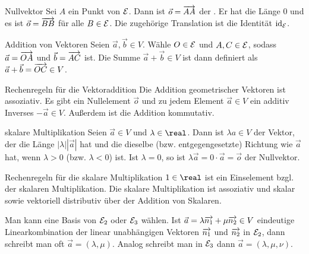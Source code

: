 \begin{Def}{Nullvektor}
    Sei $A$ ein Punkt von $\mathcal{E}$.
    Dann ist $\vec{o} = \overrightarrow{AA}$ der .
    Er hat die Länge $0$ und es ist $\vec{o} = \overrightarrow{BB}$ für alle
    $B \in \mathcal{E}$.
    Die zugehörige Translation ist die Identität $\operatorname{id}_{\mathcal{E}}$.
\end{Def}

\begin{Def}{Addition von Vektoren}
    Seien $\vec{a}, \vec{b} \in V$.
    Wähle $O \in \mathcal{E}$ und $A, C \in \mathcal{E}$, sodass $\vec{a} = \overrightarrow{OA}$
    und $\vec{b} = \overrightarrow{AC}$ ist.
    Die Summe $\vec{a} + \vec{b} \in V$ ist dann definiert als
    $\vec{a} + \vec{b} = \overrightarrow{OC} \in V$.
\end{Def}

\begin{Satz}{Rechenregeln für die Vektoraddition}
    Die Addition geometrischer Vektoren ist assoziativ.
    Es gibt ein Nullelement $\vec{o}$ und zu jedem Element
    $\vec{a} \in V$ ein additiv Inverses $-\vec{a} \in V$.
    Außerdem ist die Addition kommutativ.
\end{Satz}

\begin{Def}{skalare Multiplikation}
    Seien $\vec{a} \in V$ und $\lambda \in \real$.
    Dann ist $\lambda a \in V$ der Vektor, der die Länge
    $|\lambda| |\vec{a}|$ hat und die dieselbe (bzw. entgegengesetzte)
    Richtung wie $\vec{a}$ hat, wenn $\lambda > 0$ (bzw. $\lambda < 0$)
    ist.
    Ist $\lambda = 0$, so ist
    $\lambda \vec{a} = 0 \cdot \vec{a} = \vec{o}$ der Nullvektor.
\end{Def}

\begin{Satz}{Rechenregeln für die skalare Multiplikation}
    $1 \in \real$ ist ein Einselement bzgl. der skalaren Multiplikation.
    Die skalare Multiplikation ist assoziativ und skalar sowie vektoriell
    distributiv über der Addition von Skalaren.
\end{Satz}

\begin{Notation}
    Man kann eine Basis von $\mathcal{E}_2$ oder $\mathcal{E}_3$ wählen.
    Ist $\vec{a} = \lambda \overrightarrow{n_1} + \mu \overrightarrow{n_2} \in V$
    eindeutige Linearkombination der linear unabhängigen Vektoren
    $\overrightarrow{n_1}$ und $\overrightarrow{n_2}$ in $\mathcal{E}_2$, dann schreibt man
    oft $\vec{a} = (\lambda, \mu)$.
    Analog schreibt man in $\mathcal{E}_3$ dann $\vec{a} = (\lambda, \mu, \nu)$.
\end{Notation}

